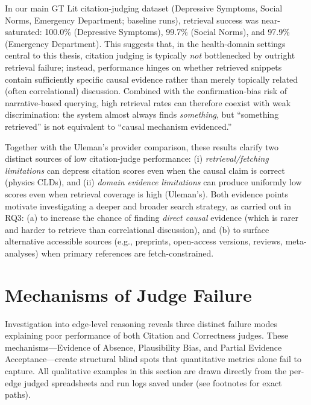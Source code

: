 In our main GT Lit citation-judging dataset (Depressive Symptoms, Social Norms, Emergency Department; baseline runs), retrieval success was near-saturated: 100.0\% (Depressive Symptoms), 99.7\% (Social Norms), and 97.9\% (Emergency Department). This suggests that, in the health-domain settings central to this thesis, citation judging is typically \textit{not} bottlenecked by outright retrieval failure; instead, performance hinges on whether retrieved snippets contain sufficiently specific causal evidence rather than merely topically related (often correlational) discussion. Combined with the confirmation-bias risk of narrative-based querying, high retrieval rates can therefore coexist with weak discrimination: the system almost always finds \textit{something}, but ``something retrieved'' is not equivalent to ``causal mechanism evidenced.''

Together with the Uleman's provider comparison, these results clarify two distinct sources of low citation-judge performance: (i) \textit{retrieval/fetching limitations} can depress citation scores even when the causal claim is correct (physics CLDs), and (ii) \textit{domain evidence limitations} can produce uniformly low scores even when retrieval coverage is high (Uleman's). Both evidence points motivate investigating a deeper and broader search strategy, as carried out in RQ3: (a) to increase the chance of finding \textit{direct causal} evidence (which is rarer and harder to retrieve than correlational discussion), and (b) to surface alternative accessible sources (e.g., preprints, open-access versions, reviews, meta-analyses) when primary references are fetch-constrained.

\section{Mechanisms of Judge Failure}
\label{sec:discussion_failure_mechanisms}

Investigation into edge-level reasoning reveals three distinct failure modes explaining poor performance of both Citation and Correctness judges. These mechanisms---Evidence of Absence, Plausibility Bias, and Partial Evidence Acceptance---create structural blind spots that quantitative metrics alone fail to capture.
All qualitative examples in this section are drawn directly from the per-edge judged spreadsheets and run logs saved under \texttt{} (see footnotes for exact paths).

